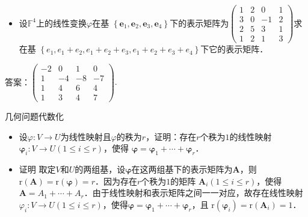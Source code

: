 \documentclass[14pt]{beamer}
\begin{document}
	\begin{frame}
\begin{itemize}
	\item<1-> 设$  \mathbb{F}^{4}  $上的线性变换$  \varphi  $在基  $\left\{\boldsymbol{e}_{1}, \boldsymbol{e}_{2}, \boldsymbol{e}_{3}, \boldsymbol{e}_{4}\right\}  $下的表示矩阵为$\left(\begin{array}{cccc}1 & 2 & 0 & 1 \\3 & 0 & -1 & 2 \\2 & 5 & 3 & 1 \\1 & 2 & 1 & 3\end{array}\right)$求在基  $\left\{e_{1}, e_{1}+e_{2}, e_{1}+e_{2}+e_{3}, e_{1}+e_{2}+e_{3}+e_{4}\right\}  $下它的表示矩阵．

\end{itemize}
\end{frame}	

\begin{frame}

答案：$\left(\begin{array}{cccc}-2 & 0 & 1 & 0 \\1 & -4 & -8 & -7 \\1 & 4 & 6 & 4 \\1 & 3 & 4 & 7\end{array}\right) \text {. }$


\end{frame}
\begin{frame}
几何问题代数化\\
\begin{itemize}
	\item<1-> 设$  \varphi: V \rightarrow U  $为线性映射且$  \varphi  $的秩为$  r  $，证明：存在$  r  $个秩为$ 1 $的线性映射$  \boldsymbol{\varphi}_{i}: V \rightarrow U(1 \leq i \leq r)  $，使得  $\boldsymbol{\varphi}=\boldsymbol{\varphi}_{1}+\cdots+\boldsymbol{\varphi}_{r}  $．
	\item<2-> 证明 取定$  V  $和$  U  $的两组基，设$  \boldsymbol{\varphi}  $在这两组基下的表示矩阵为$  \boldsymbol{A}  $，则$  \mathrm{r}(\boldsymbol{A})=   \mathrm{r}(\boldsymbol{\varphi})=r  $．因为存在$  r  $个秩为$ 1 $的矩阵  $\boldsymbol{A}_{i}(1 \leq i \leq r)  $，使得$  \boldsymbol{A}=   A_{1}+\cdots+A_{r}  $．由于线性映射和表示矩阵之间一一对应，故存在线性映射  $\varphi_{i}: V \rightarrow   U(1 \leq i \leq r)  ，使得  \boldsymbol{\varphi}=\boldsymbol{\varphi}_{1}+\cdots+\boldsymbol{\varphi}_{r}  $，且  $\mathrm{r}\left(\boldsymbol{\varphi}_{i}\right)=\mathrm{r}\left(\boldsymbol{A}_{i}\right)=1  $．
\end{itemize}
\end{frame}
\end{document}
